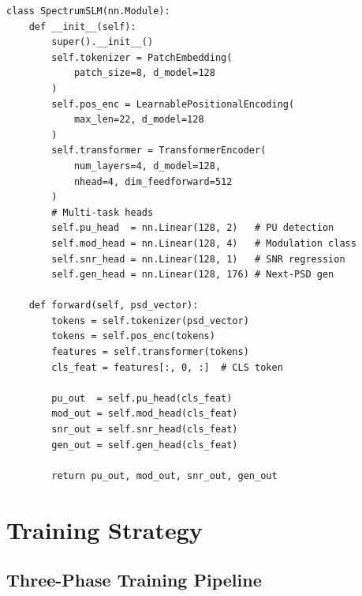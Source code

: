 \documentclass[12pt, a4paper]{article}
\begin{document}
\begin{lstlisting}[caption={Conceptual SLM Architecture in PyTorch}, label=lst:model]
class SpectrumSLM(nn.Module):
    def __init__(self):
        super().__init__()
        self.tokenizer = PatchEmbedding(
            patch_size=8, d_model=128
        )
        self.pos_enc = LearnablePositionalEncoding(
            max_len=22, d_model=128
        )
        self.transformer = TransformerEncoder(
            num_layers=4, d_model=128,
            nhead=4, dim_feedforward=512
        )
        # Multi-task heads
        self.pu_head  = nn.Linear(128, 2)   # PU detection
        self.mod_head = nn.Linear(128, 4)   # Modulation class
        self.snr_head = nn.Linear(128, 1)   # SNR regression
        self.gen_head = nn.Linear(128, 176) # Next-PSD gen

    def forward(self, psd_vector):
        tokens = self.tokenizer(psd_vector)
        tokens = self.pos_enc(tokens)
        features = self.transformer(tokens)
        cls_feat = features[:, 0, :]  # CLS token

        pu_out  = self.pu_head(cls_feat)
        mod_out = self.mod_head(cls_feat)
        snr_out = self.snr_head(cls_feat)
        gen_out = self.gen_head(cls_feat)

        return pu_out, mod_out, snr_out, gen_out
\end{lstlisting}


\section{Training Strategy}

\subsection{Three-Phase Training Pipeline}
\end{document}
